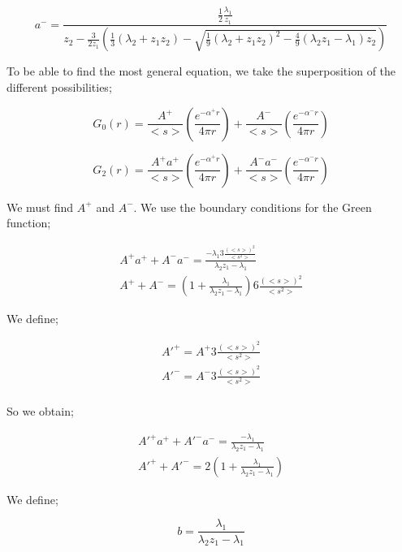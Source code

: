 \documentclass[preprint,12pt]{elsarticle}
\newcommand{\bl}{\big<}
\newcommand{\bg}{\big>}
\begin{document}
\begin{equation}
a^- = \frac{\frac{1}{2}\frac{\lambda_1}{z_1}}{z_2-\frac{3}{2z_1}\left(\frac{1}{3}\left(\lambda_2+z_1z_2\right) - \sqrt{\frac{1}{9}(\lambda_2+z_1z_2)^2 - \frac{4}{9}(\lambda_2z_1-\lambda_1)z_2}\right)}
\end{equation}

To be able to find the most general equation, we take the superposition of the different possibilities;

\begin{equation}
G_0(r) = \frac{A^+}{\bl s \bg} \left(\frac{e^{-\alpha^+ r}}{4\pi r}\right) +  \frac{A^-}{\bl s \bg} \left(\frac{e^{-\alpha^- r}}{4\pi r}\right)
\end{equation}

\begin{equation}
G_2(r) = \frac{A^+a^+}{\bl s \bg} \left(\frac{e^{-\alpha^+ r}}{4\pi r}\right) +  \frac{A^-a^-}{\bl s \bg} \left(\frac{e^{-\alpha^- r}}{4\pi r}\right)
\end{equation}

We must find $A^+$ and $A^-$. We use the boundary conditions for the Green function;

\begin{align}
A^+a^+ + A^-a^- = \frac{-\lambda_1 3\frac{\left({\bl s \bg}\right)^2}{{{\bl s^2 \bg}}}}{\lambda_2z_1-\lambda_1}\\
A^+ + A^- = \left( 1 + \frac{\lambda_1}{\lambda_2z_1-\lambda_1} \right)6\frac{\left({\bl s \bg}\right)^2}{{{\bl s^2 \bg}}}
\end{align}

We define;

\begin{align}
A'^+ = A^+ 3\frac{\left({\bl s \bg}\right)^2}{{{\bl s^2 \bg}}}\\
A'^- = A^- 3\frac{\left({\bl s \bg}\right)^2}{{{\bl s^2 \bg}}}\\
\end{align}

So we obtain;

\begin{align}
A'^+a^+ + A'^-a^- = \frac{-\lambda_1}{\lambda_2z_1-\lambda_1}\\
A'^+ + A'^- = 2\left( 1 + \frac{\lambda_1}{\lambda_2z_1-\lambda_1} \right)
\end{align}

We define;

\begin{equation}
b = \frac{\lambda_1}{\lambda_2z_1-\lambda_1}
\end{equation}
\end{document}
